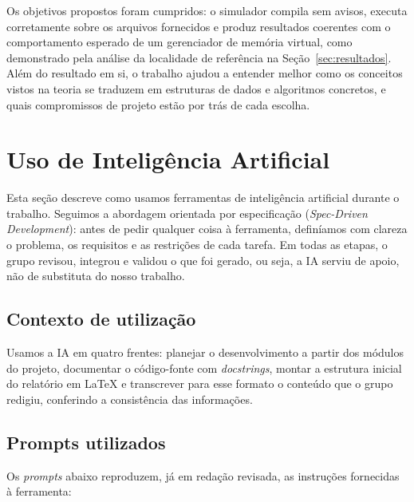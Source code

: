 \documentclass[11pt,a4paper]{article}
\begin{document}
Os objetivos propostos foram cumpridos: o simulador compila sem avisos, executa
corretamente sobre os arquivos fornecidos e produz resultados coerentes com o
comportamento esperado de um gerenciador de memória virtual, como demonstrado
pela análise da localidade de referência na Seção~\ref{sec:resultados}. Além do
resultado em si, o trabalho ajudou a entender melhor como os conceitos vistos na
teoria se traduzem em estruturas de dados e algoritmos concretos, e quais
compromissos de projeto estão por trás de cada escolha.

\section{Uso de Inteligência Artificial}
\label{sec:ia}

Esta seção descreve como usamos ferramentas de inteligência artificial durante
o trabalho. Seguimos a abordagem orientada por especificação (\textit{Spec-Driven
Development}): antes de pedir qualquer coisa à ferramenta, definíamos com clareza
o problema, os requisitos e as restrições de cada tarefa. Em todas as etapas, o
grupo revisou, integrou e validou o que foi gerado, ou seja, a IA serviu de
apoio, não de substituta do nosso trabalho.

\subsection{Contexto de utilização}
Usamos a IA em quatro frentes: planejar o desenvolvimento a partir dos módulos
do projeto, documentar o código-fonte com \textit{docstrings}, montar a estrutura
inicial do relatório em LaTeX e transcrever para esse formato o conteúdo que o
grupo redigiu, conferindo a consistência das informações.

\subsection{Prompts utilizados}
Os \textit{prompts} abaixo reproduzem, já em redação revisada, as instruções
fornecidas à ferramenta:
\end{document}
